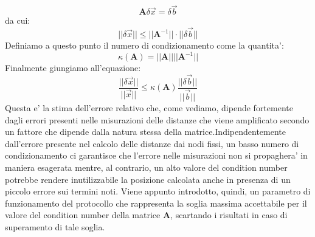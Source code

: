 \begin{equation}
\textbf{A}\delta\overrightarrow{x} = \delta\overrightarrow{b}
\end{equation}
\newline
da cui: \newline
\begin{equation}
||\delta\overrightarrow{x}|| \leq ||\textbf{A}^{-1}|| \cdot ||\delta\overrightarrow{b}||
\end{equation}
Definiamo a questo punto il numero di condizionamento come la quantita': \newline
\begin{equation}
\kappa (\textbf{A}) = ||\textbf{A}|| ||\textbf{A}^{-1}|| 
\end{equation}
\newline
Finalmente giungiamo all'equazione: \newline
\begin{equation}
\frac{||\delta\overrightarrow{x}||}{||\overrightarrow{x}||} \leq  \kappa (\textbf{A}) \frac{||\delta\overrightarrow{b}||}{||\overrightarrow{b}||}
\end{equation}
Questa e' la stima dell'errore relativo che, come vediamo, dipende fortemente dagli errori presenti nelle misurazioni delle distanze che viene amplificato secondo un fattore che dipende dalla natura stessa della matrice.\newline Indipendentemente dall'errore presente nel calcolo delle distanze dai nodi fissi, un basso numero di condizionamento ci garantisce che l'errore nelle misurazioni non si propaghera' in maniera esagerata mentre, al contrario, un alto valore del condition number potrebbe rendere inutilizzabile la posizione calcolata anche in presenza di un piccolo errore sui termini noti.\newline
Viene appunto introdotto, quindi, un parametro di funzionamento del protocollo che rappresenta la soglia massima accettabile per il valore del condition number della matrice \textbf{A}, scartando i risultati in caso di superamento di tale soglia.

